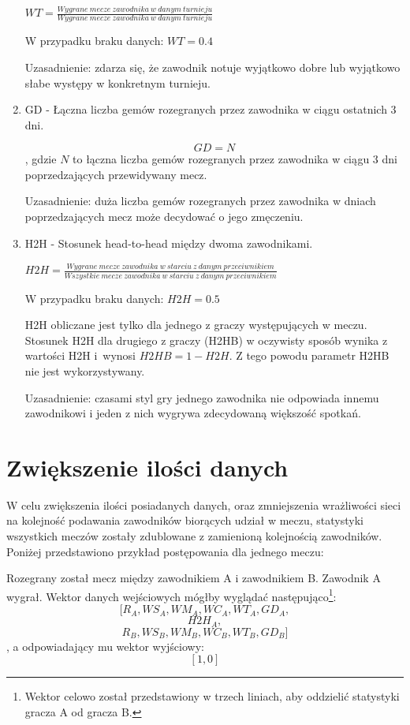 \begin{enumerate}
$WT = \frac{Wygrane\ mecze\ zawodnika\ w\ danym\ turnieju}{Wygrane\ mecze\ zawodnika\ w\ danym\ turnieju}$

W przypadku braku danych: $WT = 0.4$

Uzasadnienie: zdarza się, że zawodnik notuje wyjątkowo dobre lub wyjątkowo słabe występy w konkretnym turnieju.

\item GD - Łączna liczba gemów rozegranych przez zawodnika w ciągu ostatnich 3 dni.

$$GD = N$$, gdzie $N$ to łączna liczba gemów rozegranych przez zawodnika w ciągu 3 dni poprzedzających przewidywany mecz.

Uzasadnienie: duża liczba gemów rozegranych przez zawodnika w dniach poprzedzających mecz może decydować o jego zmęczeniu.

\item H2H - Stosunek head-to-head między dwoma zawodnikami.

$H2H = \frac{Wygrane\ mecze\ zawodnika\ w\ starciu\ z\ danym\ przeciwnikiem}{Wszystkie\ mecze\ zawodnika\ w\ starciu\ z\ danym\ przeciwnikiem}$

W przypadku braku danych: $H2H = 0.5$

H2H obliczane jest tylko dla jednego z graczy występujących w meczu. Stosunek H2H dla drugiego z graczy (H2HB) w oczywisty sposób wynika z wartości H2H i~wynosi $H2HB = 1 - H2H$. Z tego powodu parametr H2HB nie jest wykorzystywany.

Uzasadnienie: czasami styl gry jednego zawodnika nie odpowiada innemu zawodnikowi i jeden z nich wygrywa zdecydowaną większość spotkań.

\end{enumerate}

\section{Zwiększenie ilości danych}
\label{Sec:DataDouble}

W celu zwiększenia ilości posiadanych danych, oraz zmniejszenia wrażliwości sieci na kolejność podawania zawodników biorących udział w meczu, statystyki wszystkich meczów zostały zdublowane z zamienioną kolejnością zawodników. Poniżej przedstawiono przykład postępowania dla jednego meczu:

Rozegrany został mecz między zawodnikiem A i zawodnikiem B. Zawodnik A wygrał. Wektor danych wejściowych mógłby wyglądać następująco\footnote{Wektor celowo został przedstawiony w trzech liniach, aby oddzielić statystyki gracza A od gracza B.}: $$[R_A, WS_A, WM_A, WC_A, WT_A, GD_A,$$
$$H2H_A,$$  
$$R_B, WS_B, WM_B, WC_B, WT_B, GD_B]$$
, a odpowiadający mu wektor wyjściowy: $$[1, 0]$$

